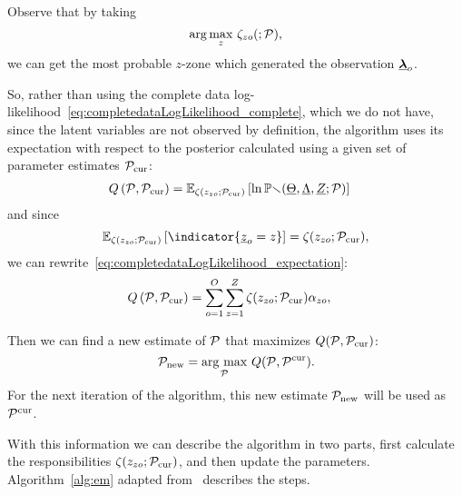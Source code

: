 \documentclass{ifacconf}  %
\begin{document}
Observe that by taking
\begin{equation}\label{eq:argmaxz}
\arg\underset{z}{\max}\ {\zeta_{zo}(;\mathcal{P})},
\end{equation}
we can get the most probable $z$-zone which generated the observation ${\underline{\boldsymbol{\lambda}}}_{o}$.


So, rather than using the complete data log-likelihood~\eqref{eq:completedataLogLikelihood_complete}, which we do not have, since the latent variables are not observed by definition, the \EM{} algorithm uses its expectation with respect to the posterior calculated using a given set of parameter estimates $\mathcal{P}_{\mathrm{cur}}$:
\begin{align}
  \label{eq:completedataLogLikelihood_expectation}
 Q\left(\set{P},\set{P}_{\mathrm{cur}}\right) &= \expectation[{\zeta(z_{zo};\set{P}_{\mathrm{cur}})}]{\ln\probability{\random{\Theta},\random{\Lambda},\random{Z};\set{P}}}
\end{align}
and since \[\expectation[{\zeta(z_{zo};\set{P}_{\mathrm{cur}})}]{\indicator{\random{z}_{o}=z}}=\zeta(z_{zo};\set{P}_{\mathrm{cur}}),\]
we can rewrite~\eqref{eq:completedataLogLikelihood_expectation}:
\begin{align}
  \label{eq:completedataLogLikelihood_expectation_developed}
Q\left(\set{P},\set{P}_{\mathrm{cur}}\right) &= \sum_{o=1}^{O}\sum_{z=1}^{Z}  \zeta(z_{zo};\set{P}_{\mathrm{cur}})\alpha_{zo},
\end{align}

Then we can find a new estimate of $\mathcal{P}$ that maximizes $Q(\mathcal{P},\mathcal{P}_{\mathrm{cur}})$:
\begin{equation} \label{eq:Mstep}
  \set{P}_{\mathrm{new}}=\underset{\set{P}}{\argmax}\ Q(\set{P},\set{P}^{\mathrm{cur}}).
\end{equation}
For the next iteration of the algorithm, this new estimate $\mathcal{P}_{\mathrm{new}}$ will be used as $\mathcal{P}^{\mathrm{cur}}$.

With this information we can describe the \EM{} algorithm in two parts, first calculate the responsibilities $\zeta(z_{zo};\mathcal{P}_{\mathrm{cur}})$, and then update the parameters.
Algorithm~\ref{alg:em} adapted from~\mbox{\cite[Chapter 9]{Bishop2006}} describes the steps.
\end{document}
